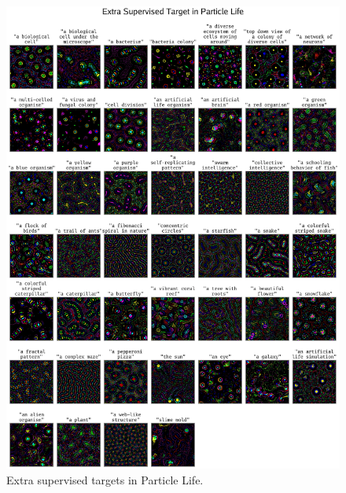 \documentclass{article}
\begin{document}
\begin{figure}[ht]
    \centering
    \includegraphics[width=1.0\linewidth]{figs/supervised_extra_2_compressed.pdf}
    \caption{Extra supervised targets in Particle Life.}
    \label{fig:supervised_extra_plife}
\end{figure}
\end{document}
